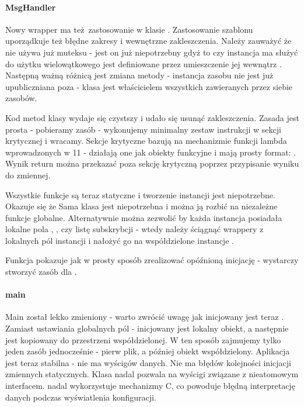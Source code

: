 \paragraph{MsgHandler}
Nowy wrapper ma też zastosowanie w klasie . Zastosowanie szablonu  uporządkuje też błędne zakresy i wewnętrzne zakleszczenia.
Należy zauważyć że  nie używa już muteksu - jest on już niepotrzebny gdyż to czy instancja ma służyć do użytku wielowątkowego jest definiowane przez umieszczenie jej wewnątrz . Następną ważną różnicą jest zmiana metody  - instancja zasobu nie jest już upubliczniana poza  - klasa jest właścicielem wszystkich zawieranych przez siebie zasobów.

Kod metod klasy  wydaje się czystszy i udało się usunąć zakleszczenia. Zasada jest prosta - pobieramy zasób - wykonujemy minimalny zestaw instrukcji w sekcji krytycznej i wracamy.
Sekcje krytyczne bazują na mechanizmie funkcji lambda wprowadzonych w \Cpp{}11 - działają one jak obiekty funkcyjne i mają prosty format: . Wynik return można przekazać poza sekcję krytyczną poprzez przypisanie wyniku do zmiennej.

Wszystkie funkcje  są teraz statyczne i tworzenie instancji jest niepotrzebne. Okazuje się że Sama klasa  jest niepotrzebna i można ją rozbić na niezależne funkcje globalne. Alternatywnie można zezwolić by każda instancja posiadała lokalne pola , , czy listę subskrybcji - wtedy należy ściągnąć wrappery  z lokalnych pól instancji i nałożyć go na współdzielone instancje .

Funkcja  pokazuje jak w prosty sposób zrealizować opóźnioną inicjację - wystarczy stworzyć zasób dla .

\paragraph{main}
Main został lekko zmieniony - warto zwrócić uwagę jak inicjowany jest teraz . Zamiast ustawiania globalnych pól - inicjowany jest lokalny obiekt, a następnie jest kopiowany do przestrzeni współdzielonej. W ten sposób zajmujemy tylko jeden zasób jednocześnie - pierw plik, a później obiekt współdzielony. 
Aplikacja jest teraz stabilna - nie ma wyścigów danych. Nie ma błędów kolejności inicjacji zmiennych statycznych. Klasa  nadal pozwala na wyścigi związane z nieatomowym interfacem.  nadal wykorzystuje mechanizmy C, co powoduje błędną interpretację danych podczas wyświatlenia konfiguracji.

